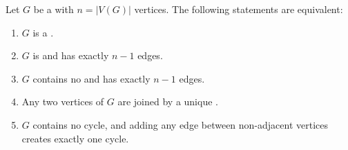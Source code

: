 \begin{proposition} \label{proposition:equivalent_conditions_for_a_graph_to_be_a_tree}
Let $G$ be a  with $n = |V(G)|$ vertices. The following statements are equivalent:

\begin{enumerate}
    \item $G$ is a .
    \item $G$ is  and has exactly $n-1$ edges.
    \item $G$ contains no  and has exactly $n-1$ edges.
    \item Any two vertices of $G$ are joined by a unique .
    \item $G$ contains no cycle, and adding any edge between non-adjacent vertices creates exactly one cycle.
\end{enumerate}
\end{proposition}
